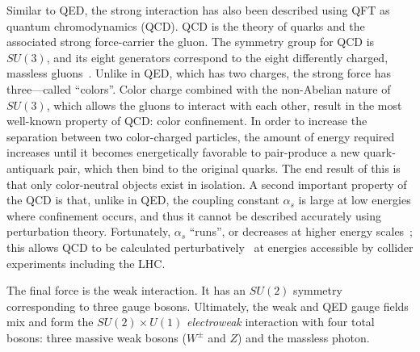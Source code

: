 Similar to QED, the strong interaction has also been described using QFT as quantum chromodynamics (QCD).
QCD is the theory of quarks and the associated strong force-carrier the gluon.
The symmetry group for QCD is $SU(3)$, and its eight generators correspond to the eight differently charged, massless gluons~\cite{1965.Han-Nambu.Propose-color}.
Unlike in QED, which has two charges, the strong force has three---called ``colors''.
Color charge combined with the non-Abelian nature of $SU(3)$, which allows the gluons to interact with each other, result in the most well-known property of QCD: color confinement.
In order to increase the separation between two color-charged particles, the amount of energy required increases until it becomes energetically favorable to pair-produce a new quark-antiquark pair, which then bind to the original quarks.
The end result of this is that only color-neutral objects exist in isolation. %
A second important property of the QCD is that, unlike in QED, the coupling constant $\alpha_s$ is large at low energies where confinement occurs, and thus it cannot be described accurately using perturbation theory.
Fortunately, $\alpha_s$ ``runs'', or decreases at higher energy scales~\cite{1973.asymptotically-free-i, 1974.asymptotically-free-ii}; this allows QCD to be calculated perturbatively~\cite{1973.strong-perturbation} at energies accessible by collider experiments including the LHC.

The final force is the weak interaction.
It has an $SU(2)$ symmetry corresponding to three gauge bosons.
Ultimately, the weak and QED gauge fields mix and form the $SU(2)\times U(1)$ \emph{electroweak} interaction with four total bosons: three massive weak bosons ($W^\pm$ and $Z$) and the massless photon.



